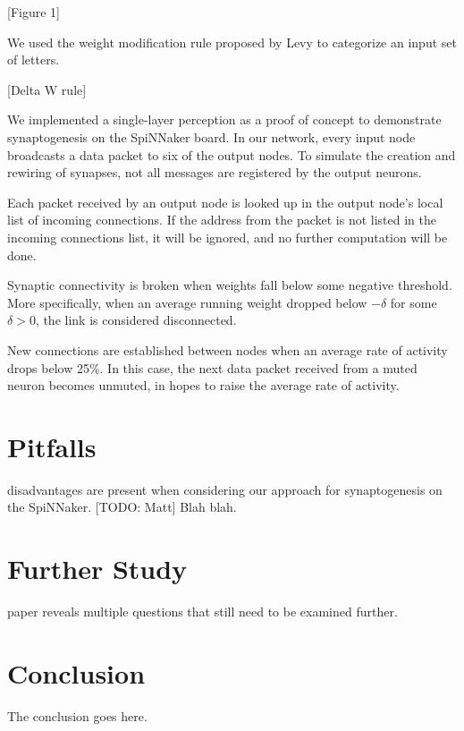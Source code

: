 \documentclass[journal]{./sty/IEEEtran}
\begin{document}
\vspace{0.5cm}
[Figure 1]
\vspace{0.5cm}

We used the weight modification rule proposed by Levy to categorize an input set of letters. 

\vspace{0.5cm}
[Delta W rule]
\vspace{0.5cm}

We implemented a single-layer perception as a proof of concept to demonstrate synaptogenesis on the SpiNNaker board. In our network, every input node broadcasts a data packet to six of the output nodes. To simulate the creation and rewiring of synapses, not all messages are registered by the output neurons. 

Each packet received by an output node is looked up in the output node's local list of incoming connections. If the address from the packet is not listed in the incoming connections list, it will be ignored, and no further computation will be done.

Synaptic connectivity is broken when weights fall below some negative threshold. More specifically, when an average running weight dropped below \(-\delta\) for some \(\delta > 0\), the link is considered disconnected.

New connections are established between nodes when an average rate of activity drops below 25\%. In this case, the next data packet received from a muted neuron becomes unmuted, in hopes to raise the average rate of activity.

\section{Pitfalls}
 disadvantages are present when considering our approach for synaptogenesis on the SpiNNaker. [TODO: Matt] Blah blah.


\section{Further Study}
 paper reveals multiple questions that still need to be examined further.

\section{Conclusion}
The conclusion goes here.


\end{document}
